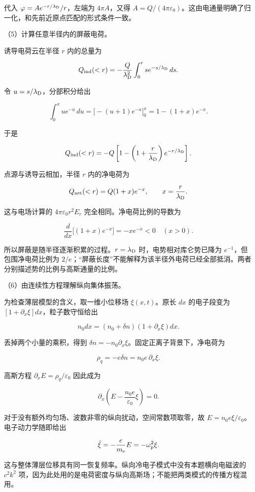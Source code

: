 \documentclass[12pt,a4paper,fontset=fandol]{ctexart}
\begin{document}
代入 \(\varphi=Ae^{-r/\lambda_{\rm D}}/r\)，左端为 \(4\pi A\)，又得
\(A=Q/(4\pi\varepsilon_0)\)。这由电通量明确了归一化，和先前近原点匹配的形式条件一致。

（5）计算任意半径内的屏蔽电荷。

诱导电荷云在半径 \(r\) 内的总量为

\[
Q_{\rm ind}(<r)
=-\frac Q{\lambda_{\rm D}^2}
\int_0^r s e^{-s/\lambda_{\rm D}}\,ds.
\]

令 \(u=s/\lambda_{\rm D}\)，分部积分给出

\[
\int_0^x u e^{-u}\,du
=\big[-(u+1)e^{-u}\big]_0^x
=1-(1+x)e^{-x}.
\]

于是

\[
Q_{\rm ind}(<r)
=-Q\left[1-\left(1+\frac r{\lambda_{\rm D}}\right)
e^{-r/\lambda_{\rm D}}\right].
\]

点源与诱导云相加，半径 \(r\) 内的净电荷为

\[
Q_{\rm net}(<r)=Q(1+x)e^{-x},\qquad x=\frac r{\lambda_{\rm D}}.
\]

这与电场计算的 \(4\pi\varepsilon_0r^2E_r\) 完全相同。净电荷比例的导数为

\[
\frac d{dx}\big[(1+x)e^{-x}\big]=-xe^{-x}<0\quad(x>0).
\]

所以屏蔽是随半径逐渐积累的过程。\(r=\lambda_{\rm D}\)
时，电势相对库仑势已降为 \(e^{-1}\)，但包围净电荷比例为
\(2/e\)；``屏蔽长度''不能解释为该半径外电荷已经全部抵消。两者分别描述势的比例与高斯通量的比例。

（6）由连续性方程理解纵向集体振荡。

为检查薄层模型的含义，取一维小位移场 \(\xi(x,t)\)。原长 \(dx\)
的电子段变为 \([1+\partial_x\xi]dx\)，粒子数守恒给出

\[
n_0dx=(n_0+\delta n)(1+\partial_x\xi)dx.
\]

丢掉两个小量的乘积，得到
\(\delta n=-n_0\partial_x\xi\)。固定正离子背景下，净电荷为

\[
\rho_q=-e\delta n=n_0e\,\partial_x\xi.
\]

高斯方程 \(\partial_xE=\rho_q/\varepsilon_0\) 因此成为

\[
\partial_x\left(E-\frac{n_0e}{\varepsilon_0}\xi\right)=0.
\]

对于没有额外均匀场、波数非零的纵向扰动，空间常数项取零，故
\(E=n_0e\xi/\varepsilon_0\)。电子动力学随即给出

\[
\ddot\xi=-\frac e{m_{\rm e}}E=-\omega_{\rm p}^2\xi.
\]

这与整体薄层位移具有同一恢复频率。纵向冷电子模式中没有本题横向电磁波的
\(c^2k^2\)
项，因为此处用的是电荷密度与纵向高斯场；不能把两类模式的传播方程混用。
\end{document}

